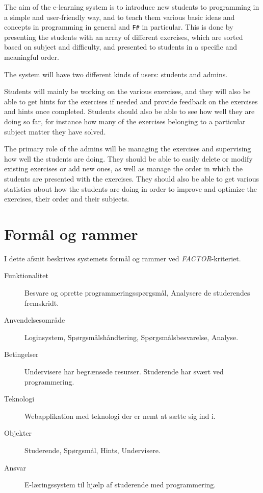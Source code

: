 \documentclass[12pt]{article}
\begin{document}
The aim of the e-learning system is to introduce new students to programming in a simple and user-friendly way, and to teach them various basic ideas and concepts in programming in general and \verb!F#! in particular. This is done by presenting the students with an array of different exercises, which are sorted based on subject and difficulty, and presented to students in a specific and meaningful order.

The system will have two different kinds of users: students and admins.

Students will mainly be working on the various exercises, and they will also be able to get hints for the exercises if needed and provide feedback on the exercises and hints once completed. Students should also be able to see how well they are doing so far, for instance how many of the exercises belonging to a particular subject matter they have solved.

The primary role of the admins will be managing the exercises and supervising how well the students are doing. They should be able to easily delete or modify existing exercises or add new ones, as well as manage the order in which the students are presented with the exercises. They should also be able to get various statistics about how the students are doing in order to improve and optimize the exercises, their order and their subjects.

\section{Formål og rammer}
\label{sec:formal_og_rammer}
I dette afsnit beskrives systemets formål og rammer ved \textit{FACTOR}-kriteriet.
\begin{description}
    \item[Funktionalitet]
        Besvare og oprette programmeringsspørgsmål, Analysere de studerendes fremskridt.
    \item[Anvendelsesområde]
        Loginsystem, Spørgsmålshåndtering, Spørgsmålsbesvarelse, Analyse.
    \item[Betingelser]
        Undervisere har begrænsede resurser. Studerende har svært ved programmering.
    \item[Teknologi]
        Webapplikation med teknologi der er nemt at sætte sig ind i.
    \item[Objekter]
        Studerende, Spørgsmål, Hints, Undervisere.
    \item[Ansvar]
        E-læringssystem til hjælp af studerende med programmering.
\end{description}
\end{document}
